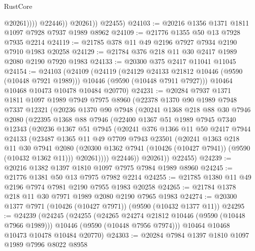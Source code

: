 \begin{lexlean}{RustCore}
\begin{coremodule}
                      @20261))))
              @22446))
          @20261))
      @22455)
@24103 := @20216 @1356 @1371 @1811 @1097 @7928 @7937 @1989 @8962
@24109 := @21776 @1355 @50 @13 @7928 @7935 @2214
@24119 := @21785 @378 @11 @49 @2196 @7927 @7934 @2190 @7910 @1983 @20258
@24129 := @21784 @376 @218 @11 @30 @2417 @1989 @2080 @2190 @7920 @1983
@24133 := @20300 @375 @2417 @11041 @11045
@24154 := @24103
    (@24109
      (@24119
        (@24129 @24133 @21812 @10446 (@9590 (@10448 @7921 @1989)))
        @10446
        (@9590 (@10448 @7911 @7927)))
      @10464
      @10468
      @10473
      @10478
      @10484
      @20770)
@24231 := @20284
    @7937
    @1371
    @1811
    @1097
    @1989
    @7949
    @7975
    @8960
    (@22378
      @1370
      @90
      @1989
      @7948
      @7337
      @12321
      (@20236
        @1370
        @90
        @7948
        (@20241
          @1368
          @218
          @88
          @30
          @7946
          @2080
          (@22395
            @1368
            @88
            @7946
            (@22400
              @1367
              @51
              @1989
              @7945
              @7340
              @12343
              (@20236
                @1367
                @51
                @7945
                (@20241
                  @376
                  @1366
                  @11
                  @50
                  @2417
                  @7944
                  @24133
                  (@23487
                    @1365
                    @11
                    @49
                    @7709
                    @7943
                    @23501
                    (@20241
                      @1363
                      @218
                      @11
                      @30
                      @7941
                      @2080
                      (@20300 @1362 @7941 (@10426 (@10427 @7941)) (@9590 (@10432 @1362 @11)))
                      @20261))))
              @22446))
          @20261))
      @22455)
@24239 := @20216 @1382 @1397 @1810 @1097 @7975 @7984 @1989 @8960
@24245 := @21776 @1381 @50 @13 @7975 @7982 @2214
@24255 := @21785 @1380 @11 @49 @2196 @7974 @7981 @2190 @7955 @1983 @20258
@24265 := @21784 @1378 @218 @11 @30 @7971 @1989 @2080 @2190 @7965 @1983
@24274 := @20300 @1377 @7971 (@10426 (@10427 @7971)) (@9590 (@10432 @1377 @11))
@24295 := @24239
    (@24245
      (@24255
        (@24265 @24274 @21812 @10446 (@9590 (@10448 @7966 @1989)))
        @10446
        (@9590 (@10448 @7956 @7974)))
      @10464
      @10468
      @10473
      @10478
      @10484
      @20770)
@24303 := @20284 @7984 @1397 @1810 @1097 @1989 @7996 @8022 @8958

\end{coremodule}
\end{lexlean}
